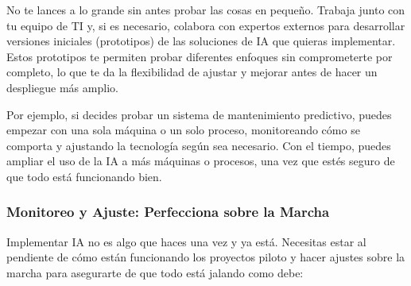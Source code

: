 \documentclass[
  10pt,
  letterpaper,
]{book}
\begin{document}
\begin{itemize}
  No te lances a lo grande sin antes probar las cosas en pequeño.
  Trabaja junto con tu equipo de TI y, si es necesario, colabora con
  expertos externos para desarrollar versiones iniciales (prototipos) de
  las soluciones de IA que quieras implementar. Estos prototipos te
  permiten probar diferentes enfoques sin comprometerte por completo, lo
  que te da la flexibilidad de ajustar y mejorar antes de hacer un
  despliegue más amplio.

  Por ejemplo, si decides probar un sistema de mantenimiento predictivo,
  puedes empezar con una sola máquina o un solo proceso, monitoreando
  cómo se comporta y ajustando la tecnología según sea necesario. Con el
  tiempo, puedes ampliar el uso de la IA a más máquinas o procesos, una
  vez que estés seguro de que todo está funcionando bien.
\end{itemize}

\subsubsection{\texorpdfstring{\textbf{Monitoreo y Ajuste: Perfecciona
sobre la
Marcha}}{Monitoreo y Ajuste: Perfecciona sobre la Marcha}}\label{monitoreo-y-ajuste-perfecciona-sobre-la-marcha}

Implementar IA no es algo que haces una vez y ya está. Necesitas estar
al pendiente de cómo están funcionando los proyectos piloto y hacer
ajustes sobre la marcha para asegurarte de que todo está jalando como
debe:
\end{document}
